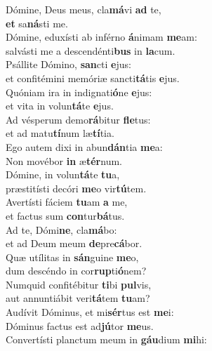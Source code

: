 \evenverse Dómine, Deus meus, cla\textbf{má}vi \textbf{ad} te,~\*\\
\evenverse \textbf{et} sa\textbf{ná}sti me.\\
\oddverse Dómine, eduxísti ab inférno \textbf{á}nimam \textbf{me}am:~\*\\
\oddverse salvásti me a descendénti\textbf{bus} in \textbf{la}cum.\\
\evenverse Psállite Dómino, \textbf{san}cti \textbf{e}jus:~\*\\
\evenverse et confitémini memóriæ sancti\textbf{tá}tis \textbf{e}jus.\\
\oddverse Quóniam ira in indignati\textbf{ó}ne \textbf{e}jus:~\*\\
\oddverse et vita in volun\textbf{tá}te \textbf{e}jus.\\
\evenverse Ad vésperum demo\textbf{rá}bitur \textbf{fle}tus:~\*\\
\evenverse et ad matu\textbf{tí}num læ\textbf{tí}tia.\\
\oddverse Ego autem dixi in abun\textbf{dán}tia \textbf{me}a:~\*\\
\oddverse Non movébor \textbf{in} æ\textbf{tér}num.\\
\evenverse Dómine, in volun\textbf{tá}te \textbf{tu}a,~\*\\
\evenverse præstitísti decóri \textbf{me}o vir\textbf{tú}tem.\\
\oddverse Avertísti fáciem \textbf{tu}am \textbf{a} me,~\*\\
\oddverse et factus sum \textbf{con}tur\textbf{bá}tus.\\
\evenverse Ad te, Dómi\textbf{ne}, cla\textbf{má}bo:~\*\\
\evenverse et ad Deum meum \textbf{de}pre\textbf{cá}bor.\\
\oddverse Quæ utílitas in \textbf{sán}guine \textbf{me}o,~\*\\
\oddverse dum descéndo in cor\textbf{rup}ti\textbf{ó}nem?\\
\evenverse Numquid confitébitur \textbf{ti}bi \textbf{pul}vis,~\*\\
\evenverse aut annuntiábit veri\textbf{tá}tem \textbf{tu}am?\\
\oddverse Audívit Dóminus, et mi\textbf{sér}tus est \textbf{me}i:~\*\\
\oddverse Dóminus factus est ad\textbf{jú}tor \textbf{me}us.\\
\evenverse Convertísti planctum meum in \textbf{gáu}dium \textbf{mi}hi:~\*\\
